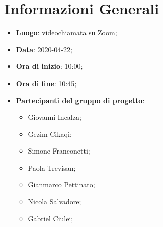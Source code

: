 \section{Informazioni Generali}
	\begin{itemize}
		\item \textbf {Luogo}: videochiamata su Zoom;
		\item \textbf {Data}: 2020-04-22;
		\item \textbf {Ora di inizio}: 10:00;
		\item \textbf {Ora di fine}: 10:45;
		\item \textbf {Partecipanti del gruppo di progetto}:
			\begin{itemize}
				\item Giovanni Incalza;
				\item Gezim Cikaqi;
				\item Simone Franconetti;
				\item Paola Trevisan;
				\item Gianmarco Pettinato;
				\item Nicola Salvadore;
				\item Gabriel Ciulei;
			\end{itemize}
	\end{itemize}